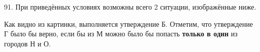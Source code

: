 91. При приведённых условиях возможны всего 2 ситуации, изображённые ниже.
\begin{center}
\begin{figure}[ht!]
\end{figure}
\end{center}
Как видно из картинки, выполняется утверждение Б. Отметим, что утверждение Г было бы верно, если бы из М можно было бы попасть {\bf только в один} из городов Н и О.\\
